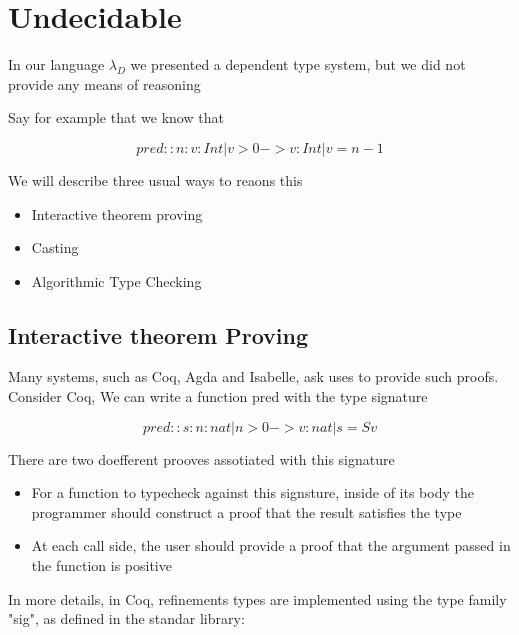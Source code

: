 \newcommand\tlabel{T-Label}
\newcommand\tcast{T-Cast}

\newcommand\cbase{C-Base}
\newcommand\cfunction{C-Fun}


\newcommand\elabel[1]{\ensuremath{\Uparrow \ #1}}
\newcommand\ecast[2]{\ensuremath{\langle #1 \Rightarrow #2 \rangle}}

\newcommand\isCompatible[2]{\ensuremath{ #1 \Vert #2 }}



\section{Undecidable}

In our language $\lambda_D$ we presented a dependent type system, 
but we did not provide any means of reasoning 

Say for example that we know that 

$$
pred :: n:{v:Int | v > 0} -> {v:Int | v = n - 1}
$$

We will describe three usual ways to reaons this

\begin{itemize}
\item Interactive theorem proving
\item Casting
\item Algorithmic Type Checking
\end{itemize}

\subsection{Interactive theorem Proving}

Many systems, such as Coq, Agda and Isabelle, ask uses to provide such proofs.
Consider Coq, 
We can write a function pred with the type signature

$$
pred :: s:{n : nat | n > 0 }  -> {v:nat | s = S v}
$$

There are two doefferent prooves assotiated with this signature
\begin{itemize}
\item For a function to typecheck against this signsture, 
inside of its body the programmer should construct a proof that the 
result satisfies the type
\item At each call side, the user should provide a proof that 
the argument passed in the function is positive
\end{itemize}

In more details, in Coq, refinements types are
implemented using the type family "sig", as defined in the standar library:

